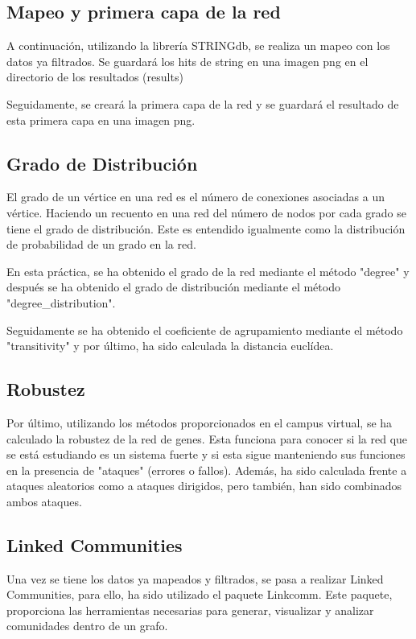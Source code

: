 \subsection{Mapeo y primera capa de la red}
A continuación, utilizando la librería STRINGdb, se realiza un mapeo con los datos ya filtrados. Se guardará los hits de string en una imagen png en el directorio de los resultados (results)

Seguidamente, se creará la primera capa de la red y se guardará el resultado de esta primera capa en una imagen png. 

\subsection{Grado de Distribución}
El grado de un vértice en una red es el número de conexiones asociadas a un vértice. Haciendo un recuento en una red del número de nodos por cada grado se tiene el grado de distribución. Este es entendido igualmente como la distribución de probabilidad de un grado en la red.

En esta práctica, se ha obtenido el grado de la red mediante el  método "degree" y después se ha obtenido el grado de distribución mediante el método "degree\_distribution".

Seguidamente se ha obtenido el coeficiente de agrupamiento mediante el método "transitivity" y por último, ha sido calculada la distancia euclídea. 

\subsection{Robustez}
Por último, utilizando los métodos proporcionados en el campus virtual, se ha calculado la robustez de la red de genes. Esta funciona para conocer si la red que se está estudiando es un sistema fuerte y si esta sigue manteniendo sus funciones en la presencia de "ataques" (errores o fallos). Además, ha sido calculada frente a ataques aleatorios como a ataques dirigidos, pero también, han sido combinados ambos ataques.


\subsection{Linked Communities}
Una vez se tiene los datos ya mapeados y filtrados, se pasa a realizar Linked Communities, para ello, ha sido utilizado el paquete Linkcomm. Este paquete, proporciona las herramientas necesarias para generar, visualizar y analizar comunidades dentro de un grafo.

